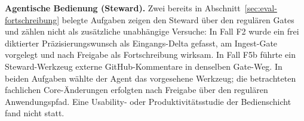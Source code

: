 \textbf{Agentische Bedienung (Steward).} Zwei bereits in
Abschnitt~\ref{sec:eval-fortschreibung} belegte Aufgaben zeigen den
Steward über den regulären Gates und zählen nicht als zusätzliche
unabhängige Versuche: In Fall F2 wurde ein frei diktierter
Präzisierungswunsch als Eingangs-Delta gefasst, am Ingest-Gate
vorgelegt und nach Freigabe als Fortschreibung wirksam. In Fall F5b
führte ein Steward-Werkzeug externe GitHub-Kommentare in denselben
Gate-Weg. In beiden Aufgaben wählte der Agent das vorgesehene
Werkzeug; die betrachteten fachlichen Core-Änderungen erfolgten nach
Freigabe über den regulären Anwendungspfad. Eine Usability- oder
Produktivitätsstudie der Bedienschicht fand nicht statt.
